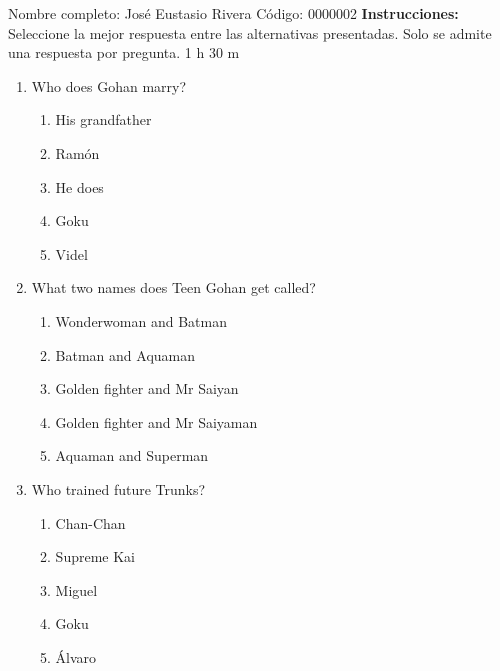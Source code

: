 \documentclass[letterpaper,addpoints,answers,twocolumn,10pt]{exam}
\begin{document}
\noindent Nombre completo: José Eustasio Rivera
\newline \newline \newline \newline
Código: 0000002\newline \newline 
{\bf Instrucciones:} Seleccione la mejor respuesta entre las alternativas presentadas. Solo se admite una respuesta por pregunta.
 1 h 30 m

\begin{enumerate}[leftmargin=.2in]




\item  Who does Gohan marry?


\begin{enumerate}[noitemsep,leftmargin=0in]


\item  His grandfather
\item  Ramón
\item  He does
\item  Goku
\item  Videl


\end{enumerate}



\item  What two names does Teen Gohan get called?


\begin{enumerate}[noitemsep,leftmargin=0in]


\item  Wonderwoman and Batman
\item  Batman and Aquaman
\item  Golden fighter and Mr Saiyan
\item  Golden fighter and Mr Saiyaman
\item  Aquaman and Superman


\end{enumerate}



\item  Who trained future Trunks?


\begin{enumerate}[noitemsep,leftmargin=0in]


\item  Chan-Chan
\item  Supreme Kai
\item  Miguel
\item  Goku
\item  Álvaro



\end{enumerate}
\end{enumerate}
\end{document}
